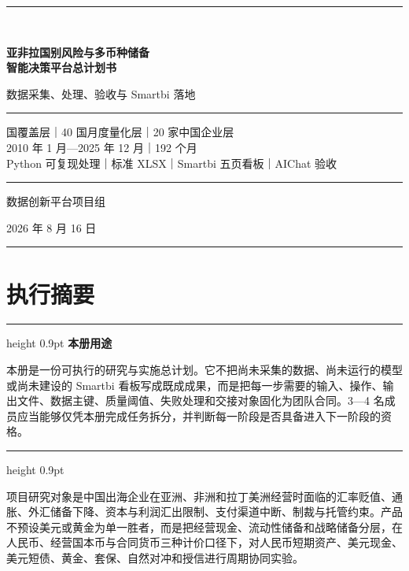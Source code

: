 \documentclass[UTF8,fontset=windows,12pt,openany]{ctexbook}
\newenvironment{decisionbox}[1][]{%
  \par\medskip\noindent\begin{center}\begin{minipage}{0.93\textwidth}%
  \color{OceanBlue}\hrule height 0.9pt\vspace{0.45em}%
  \textbf{#1}\par\smallskip\color{black}%
}{%
  \par\vspace{0.35em}\color{OceanBlue}\hrule height 0.9pt%
  \end{minipage}\end{center}\medskip%
}
\begin{document}
\begin{titlepage}
  \pagecolor{PaleBlue}
  \centering
  \vspace*{1.6cm}
  {\color{OceanBlue}\rule{0.88\textwidth}{1.5pt}}\\[1.05cm]
  {\Huge\bfseries\color{DeepNavy}亚非拉国别风险与多币种储备\\[0.35cm]智能决策平台总计划书\par}
  \vspace{0.7cm}
  {\LARGE\color{OceanBlue}数据采集、处理、验收与 Smartbi 落地\par}
  \vspace{1.0cm}
  \begin{minipage}{0.86\textwidth}
    \color{GoldLine}\rule{\textwidth}{0.9pt}\par\vspace{0.45cm}
    \color{black} 国覆盖层｜40 国月度量化层｜20 家中国企业层\\[0.25cm]
    2010 年 1 月—2025 年 12 月｜192 个月\\[0.25cm]
    Python 可复现处理｜标准 XLSX｜Smartbi 五页看板｜AIChat 验收
    \vspace{0.45cm}\par\color{GoldLine}\rule{\textwidth}{0.9pt}
  \end{minipage}
  \vfill
  {\large 数据创新平台项目组\par}
  \vspace{0.25cm}
  {\large 2026 年 8 月 16 日\par}
  \vspace{0.75cm}
  {\color{OceanBlue}\rule{0.88\textwidth}{1.5pt}}
  \nopagecolor
\end{titlepage}

\frontmatter

\chapter*{执行摘要}

\begin{decisionbox}[本册用途]
本册是一份可执行的研究与实施总计划。它不把尚未采集的数据、尚未运行的模型或尚未建设的 Smartbi 看板写成既成成果，而是把每一步需要的输入、操作、输出文件、数据主键、质量阈值、失败处理和交接对象固化为团队合同。3—4 名成员应当能够仅凭本册完成任务拆分，并判断每一阶段是否具备进入下一阶段的资格。
\end{decisionbox}

项目研究对象是中国出海企业在亚洲、非洲和拉丁美洲经营时面临的汇率贬值、通胀、外汇储备下降、资本与利润汇出限制、支付渠道中断、制裁与托管约束。产品不预设美元或黄金为单一胜者，而是把经营现金、流动性储备和战略储备分层，在人民币、经营国本币与合同货币三种计价口径下，对人民币短期资产、美元现金、美元短债、黄金、套保、自然对冲和授信进行周期协同实验。
\end{document}
